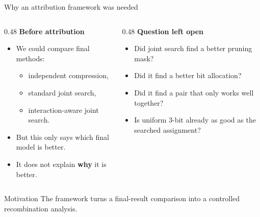 \documentclass[aspectratio=169]{beamer}
\begin{document}
\begin{frame}{Why an attribution framework was needed}
\begin{columns}[T]
\begin{column}{0.48\textwidth}
\textbf{Before attribution}
\begin{itemize}
    \item We could compare final methods:
    \begin{itemize}
        \item independent compression,
        \item standard joint search,
        \item interaction-aware joint search.
    \end{itemize}
    \item But this only says which final model is better.
    \item It does not explain \textbf{why} it is better.
\end{itemize}
\end{column}

\begin{column}{0.48\textwidth}
\textbf{Question left open}
\begin{itemize}
    \item Did joint search find a better pruning mask?
    \item Did it find a better bit allocation?
    \item Did it find a pair that only works well together?
    \item Is uniform 3-bit already as good as the searched assignment?
\end{itemize}
\end{column}
\end{columns}

\vspace{0.25cm}
\begin{block}{Motivation}
The framework turns a final-result comparison into a controlled recombination analysis.
\end{block}
\end{frame}

\end{document}
